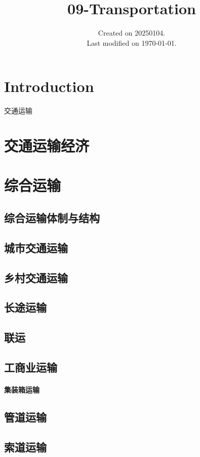 \documentclass[UTF8]{../ApplicationUniverse}
\begin{document}
\title{09-Transportation}
\date{Created on 20250104.\\   Last modified on \today.}
\maketitle
\tableofcontents


\chapter{Introduction}


交通运输



\chapter{交通运输经济}



\chapter{综合运输}
\section{综合运输体制与结构}
\section{城市交通运输}
\section{乡村交通运输}
\section{长途运输}
\section{联运}
\section{工商业运输}
    \subsubsection{集装箱运输}
\section{管道运输}
\section{索道运输}
\end{document}
